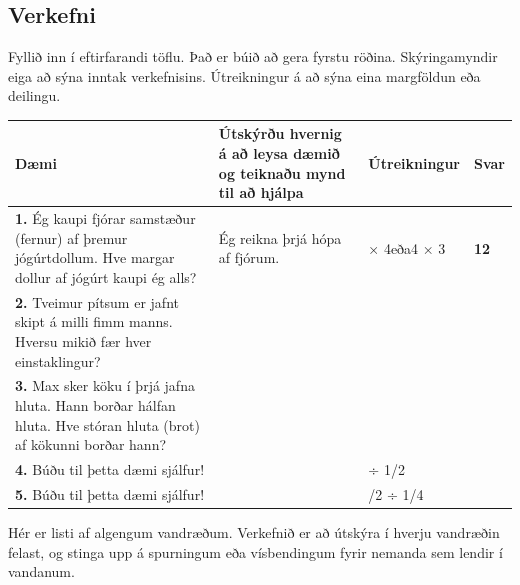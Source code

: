 \documentclass[
  icelandic,
]{book}
\begin{document}
\subsection{Verkefni}\label{verkefni-3}

Fyllið inn í eftirfarandi töflu. Það er búið að gera fyrstu röðina. Skýringamyndir eiga að sýna inntak verkefnisins. Útreikningur á að sýna eina margföldun eða deilingu.

\begin{longtable}[]{@{}
  >{\raggedright\arraybackslash}p{}
  >{\raggedright\arraybackslash}p{}
  >{\raggedright\arraybackslash}p{}
  >{\raggedright\arraybackslash}p{}@{}}
\toprule\noalign{}
\begin{minipage}[b]{\linewidth}\raggedright
\textbf{Dæmi}
\end{minipage} & \begin{minipage}[b]{\linewidth}\raggedright
\textbf{Útskýrðu hvernig á að leysa dæmið og teiknaðu mynd til að hjálpa}
\end{minipage} & \begin{minipage}[b]{\linewidth}\raggedright
\textbf{Útreikningur}
\end{minipage} & \begin{minipage}[b]{\linewidth}\raggedright
\textbf{Svar}
\end{minipage} \\
\midrule\noalign{}
\endhead
\bottomrule\noalign{}
\endlastfoot
\textbf{1.} Ég kaupi fjórar samstæður (fernur) af þremur jógúrtdollum. Hve margar dollur af jógúrt kaupi ég alls? & Ég reikna þrjá hópa af fjórum. & 3 × 4eða4 × 3 & \textbf{12} \\
\textbf{2.} Tveimur pítsum er jafnt skipt á milli fimm manns. Hversu mikið fær hver einstaklingur? & & & \\
\textbf{3.} Max sker köku í þrjá jafna hluta. Hann borðar hálfan hluta. Hve stóran hluta (brot) af kökunni borðar hann? & & & \\
\textbf{4.} Búðu til þetta dæmi sjálfur! & & 3 ÷ 1/2 & \\
\textbf{5.} Búðu til þetta dæmi sjálfur! & & 1/2 ÷ 1/4 & \\
\end{longtable}

Hér er listi af algengum vandræðum. Verkefnið er að útskýra í hverju vandræðin felast, og stinga upp á spurningum eða vísbendingum fyrir nemanda sem lendir í vandanum.
\end{document}
